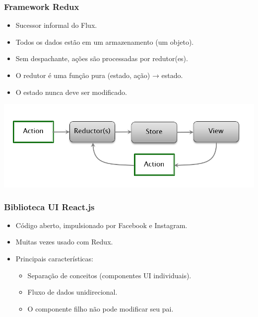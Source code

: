 \documentclass{beamer}
\begin{document}
\begin{frame}
      \frametitle{Framework Redux}

      \begin{itemize}
            \item Sucessor informal do Flux.
            \item Todos os dados estão em um armazenamento (um objeto).
            \item Sem despachante, ações são processadas por redutor(es).
            \item O redutor é uma função pura (estado, ação) → estado.
            \item O estado nunca deve ser modificado.
      \end{itemize}
      \begin{center}
            \includegraphics[width=0.8\linewidth]{assets/aula-tads-pdwa5/redux.png}
      \end{center}
\end{frame}
\begin{frame}
      \frametitle{Biblioteca UI React.js}
      
      \begin{itemize}
          \item Código aberto, impulsionado por Facebook e Instagram.
          \item Muitas vezes usado com Redux.
          \item Principais características:
          \begin{itemize}
              \item Separação de conceitos (componentes UI individuais).
              \item Fluxo de dados unidirecional.
              \item O componente filho não pode modificar seu pai.
          \end{itemize}
      \end{itemize}
      
      \end{frame}
      
\end{document}

